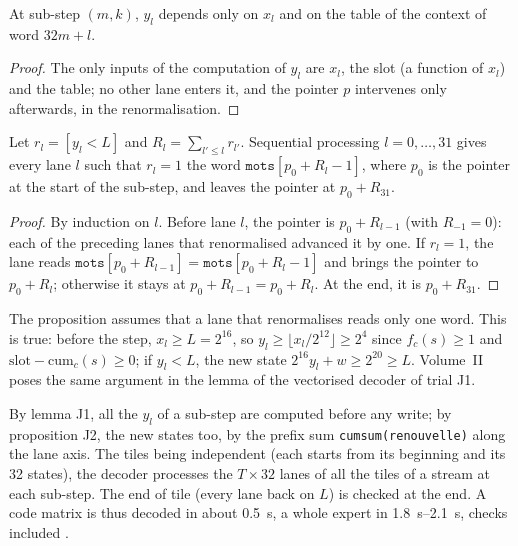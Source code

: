 \begin{lemme}\label{t3jug:lem:j1}
At sub-step $(m, k)$, $y_l$ depends only on $x_l$ and on the table of the context of word $32m + l$.
\end{lemme}
\begin{proof}
The only inputs of the computation of $y_l$ are $x_l$, the slot (a function of $x_l$) and the table; no other lane enters it, and the pointer $p$ intervenes only afterwards, in the renormalisation.
\end{proof}

\begin{proposition}\label{t3jug:prop:j2}
Let $r_l = [y_l < L]$ and $R_l = \sum_{l' \le l} r_{l'}$. Sequential processing $l = 0, \dots, 31$ gives every lane $l$ such that $r_l = 1$ the word $\texttt{mots}[p_0 + R_l - 1]$, where $p_0$ is the pointer at the start of the sub-step, and leaves the pointer at $p_0 + R_{31}$.
\end{proposition}
\begin{proof}
By induction on $l$. Before lane $l$, the pointer is $p_0 + R_{l-1}$ (with $R_{-1} = 0$): each of the preceding lanes that renormalised advanced it by one. If $r_l = 1$, the lane reads $\texttt{mots}[p_0 + R_{l-1}] = \texttt{mots}[p_0 + R_l - 1]$ and brings the pointer to $p_0 + R_l$; otherwise it stays at $p_0 + R_{l-1} = p_0 + R_l$. At the end, it is $p_0 + R_{31}$.
\end{proof}

\begin{remarque}
The proposition assumes that a lane that renormalises reads only one word. This is true: before the step, $x_l \ge L = 2^{16}$, so $y_l \ge \lfloor x_l / 2^{12}\rfloor \ge 2^{4}$ since $f_c(s) \ge 1$ and $\text{slot} - \mathrm{cum}_c(s) \ge 0$; if $y_l < L$, the new state $2^{16} y_l + w \ge 2^{20} \ge L$. Volume~II poses the same argument in the lemma of the vectorised decoder of trial J1.
\end{remarque}

By lemma J1, all the $y_l$ of a sub-step are computed before any write; by proposition J2, the new states too, by the prefix sum \texttt{cumsum(renouvelle)} along the lane axis. The tiles being independent (each starts from its beginning and its 32 states), the decoder processes the $T \times 32$ lanes of all the tiles of a stream at each sub-step. The end of tile (every lane back on $L$) is checked at the end. A code matrix is thus decoded in about \SI{0.5}{\second}, a whole expert in \SIrange{1.8}{2.1}{\second}, checks included \mes.

